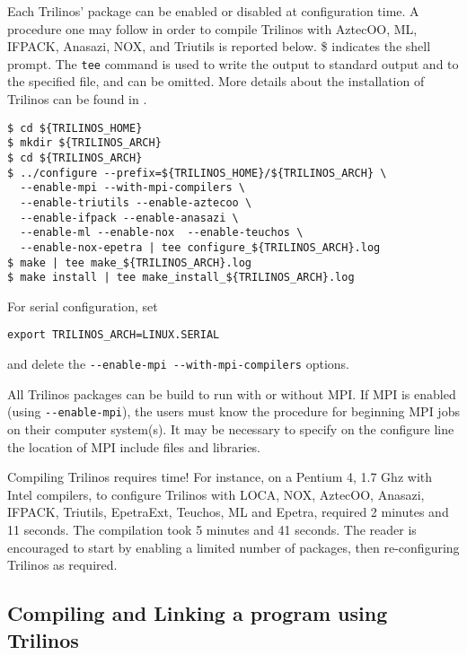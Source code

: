 \smallskip

Each Trilinos' package can be enabled or disabled at configuration time.
A procedure one may follow in order to compile Trilinos with AztecOO,
ML, IFPACK, Anasazi, NOX, and Triutils is reported below. \$ indicates the
shell prompt. The \verb!tee! command is used to write the output to
standard output and to the specified file, and can be omitted.  More
details about the installation of Trilinos can be found in
\cite{Trilinos-Users-Guide}.
\begin{verbatim}
$ cd ${TRILINOS_HOME}
$ mkdir ${TRILINOS_ARCH}
$ cd ${TRILINOS_ARCH}
$ ../configure --prefix=${TRILINOS_HOME}/${TRILINOS_ARCH} \
  --enable-mpi --with-mpi-compilers \
  --enable-triutils --enable-aztecoo \
  --enable-ifpack --enable-anasazi \
  --enable-ml --enable-nox  --enable-teuchos \
  --enable-nox-epetra | tee configure_${TRILINOS_ARCH}.log
$ make | tee make_${TRILINOS_ARCH}.log
$ make install | tee make_install_${TRILINOS_ARCH}.log
\end{verbatim}
For serial configuration, set
\begin{verbatim}
export TRILINOS_ARCH=LINUX.SERIAL
\end{verbatim}
and delete the \verb!--enable-mpi --with-mpi-compilers! options.
\begin{remark}
  All Trilinos packages can be build to run with or without MPI. If MPI
  is enabled (using \verb!--enable-mpi!), the users must know the
  procedure for beginning MPI jobs on their computer system(s). It may be
  necessary to specify on the configure line the location of MPI include
  files and libraries.
\end{remark}

\begin{remark}
  Compiling Trilinos requires time! For instance, on a Pentium 4, 1.7
  Ghz with Intel compilers, to configure Trilinos with LOCA, NOX,
  AztecOO, Anasazi, IFPACK, Triutils, EpetraExt, Teuchos, ML and Epetra,
  required 2 minutes and 11 seconds. The compilation took 5 minutes and
  41 seconds. The reader is encouraged to start by enabling a limited
  number of packages, then re-configuring Trilinos as required.
\end{remark}


\subsection{Compiling and Linking a program using Trilinos}
\label{sec:intro_compiling}

